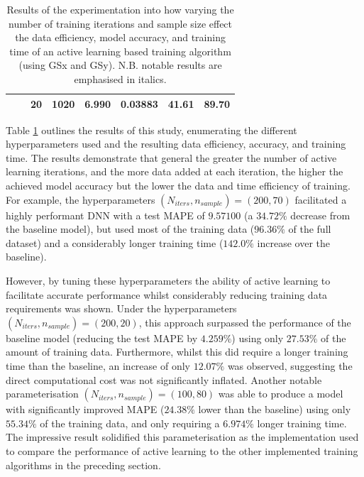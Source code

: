 \documentclass[a4paper, 11pt]{report}
\begin{document}
\begin{table}[ht]
\begin{tabular}{|l|l|l|l|l|l|l|l|}
        \cline{3-8}
                                                                                &                                                                                 & 20                                                                     & 1020                                                                       & 6.990                                                                                             & 0.03883          & 41.61          & 89.70                                                                       \\
        \hline
        \end{tabular}
        \caption{\centering Results of the experimentation into how varying the number of training iterations and sample size effect the data efficiency, model accuracy, and training time of an active learning based training algorithm (using GSx and GSy). N.B. notable results are emphasised in italics.}
        \label{table: al-efficiency}
    \end{table}


    Table \ref{table: al-efficiency} outlines the results of this study, enumerating the different hyperparameters used and the resulting data efficiency, accuracy, and training time. The results demonstrate that general the greater the number of active learning iterations, and the more data added at each iteration, the higher the achieved model accuracy but the lower the data and time efficiency of training. For example, the hyperparameters $(N_{iters}, n_{sample}) = (200, 70)$ facilitated a highly performant DNN with a test MAPE of $9.57100$ (a $34.72\%$ decrease from the baseline model), but used most of the training data ($96.36\%$ of the full dataset) and a considerably longer training time ($142.0\%$ increase over the baseline).

    However, by tuning these hyperparameters the ability of active learning to facilitate accurate performance whilst considerably reducing training data requirements was shown. Under the hyperparameters $(N_{iters}, n_{sample}) = (200, 20)$, this approach surpassed the performance of the baseline model (reducing the test MAPE by $4.259\%$) using only $27.53\%$ of the amount of training data. Furthermore, whilst this did require a longer training time than the baseline, an increase of only $12.07\%$ was observed, suggesting the direct computational cost was not significantly inflated. Another notable parameterisation $(N_{iters}, n_{sample}) = (100, 80)$ was able to produce a model with significantly improved MAPE ($24.38\%$ lower than the baseline) using only $55.34\%$ of the training data, and only requiring a $6.974\%$ longer training time. The impressive result solidified this parameterisation as the implementation used to compare the performance of active learning to the other implemented training algorithms in the preceding section.
\end{document}

